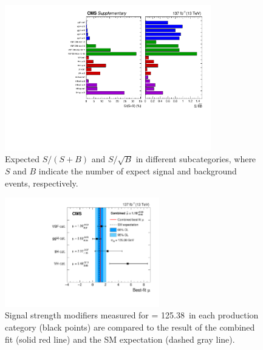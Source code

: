 \begin{figure}[!htb]
    \centering
    \captionsetup{justification=justified}
    \includegraphics[width=0.80\textwidth]{pics/results/purity_signif.pdf}
    \caption{Expected $S/(S+B)$ and $S/\sqrt{B}$ in different subcategories, 
             where $S$ and $B$ indicate the number of expect signal and background events, respectively.}
    \label{fig:sum_cats_SB}
\end{figure}


\begin{figure}[!htb]
    \centering
    \captionsetup{justification=justified}
    \includegraphics[width=0.60\textwidth]{pics/results/sig_strength.pdf}
    \caption{Signal strength modifiers measured for \mh = 125.38~\GeV in each production category (black points) 
             are compared to the result of the combined fit (solid red line) and the SM expectation (dashed gray line).}
    \label{fig:sum_sig_strength}
\end{figure}

